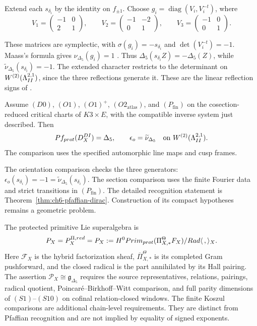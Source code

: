 Extend each \(s_{\delta_i}\) by the identity on \(f_{\pm1}\).
Choose \(g_i=\operatorname{diag}(V_i,V_i^{-t})\), where
\[
 V_1=\begin{pmatrix}-1&0\\2&1\end{pmatrix},\qquad
 V_2=\begin{pmatrix}-1&-2\\0&1\end{pmatrix},\qquad
 V_3=\begin{pmatrix}-1&0\\0&1\end{pmatrix}.
\]

These matrices are symplectic, with \(\sigma(g_i)=-s_{\delta_i}\) and
\(\det(V_i^{-t})=-1\). Maass's formula gives
\(\nu_{\Delta_5}(g_i)=1\) \cite[(1.5)]{GN}.
Thus \(\Delta_5(s_{\delta_i}Z)=-\Delta_5(Z)\), while
\(\widetilde\nu_{\Delta_5}(s_{\delta_i})=-1\).
The extended character restricts to the determinant on
\(W^{(2)}(\Lambda^{2,1}_{II})\), since the three reflections generate it.
These are the linear reflection signs of
\cite[Propositions 2.1--2.2]{GN}.

\begin{theorem}
\label{thm:pentadic-pfaffian-dirac}
Assume \((D0)\), \((O1)\), \((O1)^+\),
\((O2_{\mathrm{atlas}})\), and \((P_{\mathrm{fin}})\) on the
cosection-reduced critical charts of \(K3\times E\), with the
compatible inverse system just described. Then
\[
 Pf_{prot}(D_X^{DI})=\Delta_5,
 \qquad \epsilon_o=\widetilde\nu_{\Delta_5}
       \quad\hbox{on }W^{(2)}(\Lambda^{2,1}_{II}).
\]
The comparison uses the specified automorphic line maps and cusp frames.
\end{theorem}

The orientation comparison checks the three generators:
\(\epsilon_o(s_{\delta_i})=-1=
\widetilde\nu_{\Delta_5}(s_{\delta_i})\).
The section comparison
uses the finite Fourier data and strict transitions in
\((P_{\mathrm{fin}})\). The detailed recognition statement is
Theorem~\ref{thm:ch6-pfaffian-dirac}. Construction of its compact
hypotheses remains a geometric problem.

\begin{remark}
\label{rem:conditioning-named}
The protected primitive Lie superalgebra is
\[
 P_X=P_X^{\Pi,red}=P_X
 :=H^0Prim_{prot}(\Pi^\Theta_{X,*}F_X)
 /Rad\langle\,,\rangle_X.
\]
Here \(\mathcal F_X\) is the hybrid factorization sheaf,
\(\overline\Pi^\Theta_{X,*}\) is its completed Gram pushforward,
and the closed radical is the part annihilated by its Hall pairing.
The assertion \(\mathcal P_X\cong\mathfrak g_{\Delta_5}\)
requires the source representatives, relations, pairings, radical
quotient, Poincar\'e--Birkhoff--Witt comparison, and full parity
dimensions of \((S1)\)--\((S10)\) on cofinal relation-closed
windows. The finite Koszul comparisons are additional chain-level
requirements. They are distinct from Pfaffian recognition and are
not implied by equality of signed exponents.
\end{remark}


